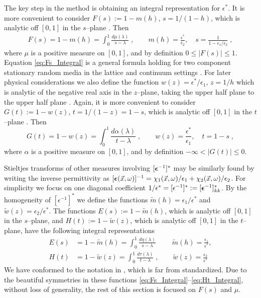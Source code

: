 \documentclass[english,12pt]{ttuthes}
\newcommand\beps{\mbox{\boldmath${\epsilon}$}}
\begin{document}
The key step in the method is obtaining an integral representation for
$\epsilon^*$. It is more convenient to consider $F(s):=1-m(h)$, $s=1/(1-h)$,
which is analytic off $[0,1]$ in the $s$--plane
\cite{Bergman:PRC-377,Golden:CMP-473}.  Then \cite{Golden:CMP-473}
%
\begin{align} \label{eq:Fs_Integral}
	F(s)=1-m(h)
	=\int_0^1 \frac{d\mu(\lambda)}{s-\lambda}\;,
   \qquad m(h)=\frac{\epsilon^*}{\epsilon_2},
   \quad s = \frac{1}{1-\epsilon_1/\epsilon_2}\;,   
 \end{align}
%
where $\mu$ is a positive measure on $[0,1]$, and by definition
$0\leq|F(s)|\leq1$. Equation \eqref{eq:Fs_Integral} is a
general formula holding for two component stationary random media in
the lattice and continuum settings \cite{Golden:PRL-3935}. For later
physical considerations we also define the function $w(z)=\epsilon^*/\epsilon_1$,
$z=1/h$ which is analytic of the negative real axis in the $z$--plane, 
taking the upper half plane to the upper half plane
\cite{Golden:CMP-473}. Again, it is more convenient to consider
$G(t):=1-w(z)$, $t=1/(1-z)=1-s$, which is analytic off $[0,1]$ in the 
$t$--plane \cite{Bergman:PRC-377,Golden:CMP-473,Bergman:AP-78}. Then  
%
\begin{equation}\label{eq:Gt_Integral}
	G(t)=1-w(z) 
	=\int_0^1\frac{d\alpha(\lambda)}{t-\lambda}\;,
        \qquad w(z)=\frac{\epsilon^*}{\epsilon_1},
   \quad t=1-s\;,
\end{equation}
%
where $\alpha$ is a positive measure on $[0,1]$, and by definition
$-\infty<|G(t)|\leq0$.

Stieltjes transforms of other measures involving $[\beps^{-1}]^*$ may
be similarly found by writing the inverse permittivity as
$[\beps(\vec{x},\omega)]^{-1}=\chi_1(\vec{x},\omega)/\epsilon_1+\chi_2(\vec{x},\omega)/\epsilon_2$. For
simplicity we focus on one diagonal coefficient
$1/\epsilon^*=[\epsilon^{-1}]^*:=[\beps^{-1}]^*_{kk}$. By the homogeneity of
$[\epsilon^{-1}]^*$ we define the functions $\tilde{m}(h)=\epsilon_1/\epsilon^*$ and
$\tilde{w}(z)=\epsilon_2/\epsilon^*$. The functions $E(s):=1-\tilde{m}(h)$, which is 
analytic off $[0,1]$ in the $s$--plane, and $H(t):=1-\tilde{w}(z)$,
which is analytic off $[0,1]$ in the $t$--plane, have the following
integral representations \cite{Bergman:AP-78,Golden:CMP-473} 
%
\begin{align}\label{eq:Es_Integral}
  E(s)&=1-\tilde{m}(h)=\int_0^1\frac{d\eta(\lambda)}{s-\lambda}\;
\qquad \tilde{m}(h)=\frac{\epsilon_1}{\epsilon^*}, \\
\label{eq:Ht_Integral}
H(t)&=1-\tilde{w}(z)=\int_0^1\frac{d\tau(\lambda)}{t-\lambda}\;,
\qquad \tilde{w}(z)=\frac{\epsilon_2}{\epsilon^*}
\end{align}
% 
We have conformed to the notation in \cite{Bergman:AP-78}, which is
far from standardized. Due to the beautiful symmetries in these
functions \eqref{eq:Fs_Integral}--\eqref{eq:Ht_Integral}, without
loss of generality, the rest of this section is focused on $F(s)$ and
$\mu$.    
\end{document}
